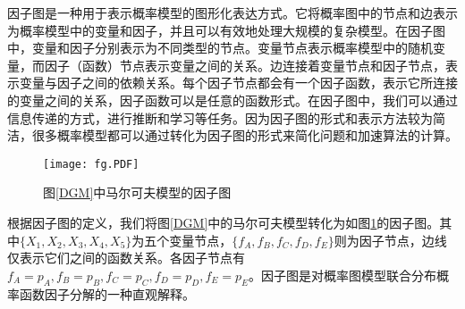 \documentclass{xdupgthesis}
\begin{document}
因子图是一种用于表示概率模型的图形化表达方式。它将概率图中的节点和边表示为概率模型中的变量和因子，并且可以有效地处理大规模的复杂模型。在因子图中，变量和因子分别表示为不同类型的节点。变量节点表示概率模型中的随机变量，而因子（函数）节点表示变量之间的关系。边连接着变量节点和因子节点，表示变量与因子之间的依赖关系。每个因子节点都会有一个因子函数，表示它所连接的变量之间的关系，因子函数可以是任意的函数形式\parencite{factorgraph}。在因子图中，我们可以通过信息传递的方式，进行推断和学习等任务。因为因子图的形式和表示方法较为简洁，很多概率模型都可以通过转化为因子图的形式来简化问题和加速算法的计算。

\begin{figure}[!htb]
    \centering
    \texttt{[image: fg.PDF]}
    \caption{图\ref{DGM}中马尔可夫模型的因子图}
    \label{fg}
\end{figure}
根据因子图的定义，我们将图\ref{DGM}中的马尔可夫模型转化为如图\ref{fg}的因子图。其中$\{X_1,X_2,X_3,X_4,X_5\}$为五个变量节点，$\{f_A,f_B,f_C,f_D,f_E\}$则为因子节点，边线仅表示它们之间的函数关系。各因子节点有$f_A=p_A,f_B=p_B,f_C=p_C,f_D=p_D,f_E=p_E$。因子图是对概率图模型联合分布概率函数因子分解的一种直观解释。
\end{document}
